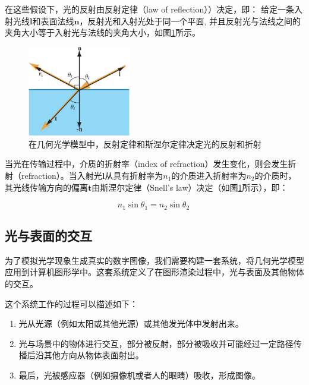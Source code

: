 在这些假设下，光的反射由反射定律（law of reflection））决定，即： 给定一条入射光线$\mathbf{l}$和表面法线$\mathbf{n}$，反射光和入射光处于同一个平面, 并且反射光与法线之间的夹角大小等于入射光与法线的夹角大小，如图\ref{f:intro-Ray-optics-model}所示。

\begin{figure}
\sidecaption
	\includegraphics[width=0.4\textwidth]{graphics/gi/ray-optics-1}
	\caption{在几何光学模型中，反射定律和斯涅尔定律决定光的反射和折射}
	\label{f:intro-Ray-optics-model}
\end{figure}

当光在传输过程中，介质的折射率（index of refraction）发生变化，则会发生折射（refraction）。当入射光$\mathbf{l}$从具有折射率为$n_1$的介质进入折射率为$n_2$的介质时， 其光线传输方向的偏离$\mathbf{t}$由斯涅尔定律（Snell's law）决定（如图\ref{f:intro-Ray-optics-model}所示），即：

\begin{equation}\label{eq:intro-snell-Law}
	n_1\sin\theta_1 = n_2\sin\theta_2\ 	
\end{equation}





\subsection{光与表面的交互}
为了模拟光学现象生成真实的数字图像，我们需要构建一套系统，将几何光学模型应用到计算机图形学中。这套系统定义了在图形渲染过程中，光与表面及其他物体的交互。

这个系统工作的过程可以描述如下：

\begin{enumerate}
	\item 光从光源（例如太阳或其他光源）或其他发光体中发射出来。
	\item 光与场景中的物体进行交互，部分被反射，部分被吸收并可能经过一定路径传播后沿其他方向从物体表面射出。
	\item 最后，光被感应器（例如摄像机或者人的眼睛）吸收，形成图像。
\end{enumerate}

